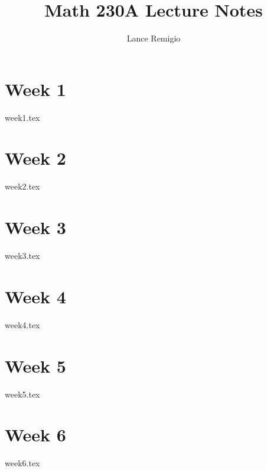 \documentclass{report}
\title{Math 230A Lecture Notes}
\author{Lance Remigio}
\begin{document}
\maketitle 
\tableofcontents


\chapter{Week 1}

{week1.tex}

\chapter{Week 2}

{week2.tex}

\chapter{Week 3}

{week3.tex}

\chapter{Week 4}

{week4.tex}

\chapter{Week 5}

{week5.tex}

\chapter{Week 6}

{week6.tex}
\end{document}
